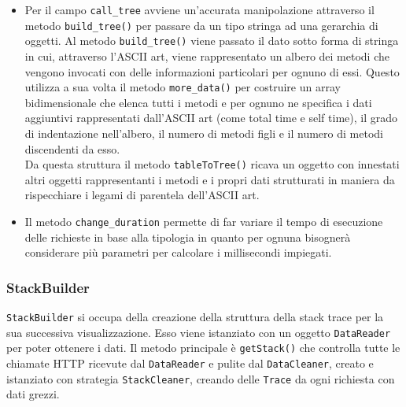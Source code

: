 \begin{itemize}
	\item Per il campo \texttt{call\_tree} avviene un'accurata manipolazione attraverso il metodo \texttt{build\_tree()} per passare da un tipo stringa ad una gerarchia di oggetti.
	Al metodo \texttt{build\_tree()} viene passato il dato sotto forma di stringa in cui, attraverso l'ASCII art, viene rappresentato un albero dei metodi che vengono invocati con delle informazioni particolari per ognuno di essi. Questo utilizza a sua volta il metodo \texttt{more\_data()} per costruire un array bidimensionale che elenca tutti i metodi e per ognuno ne specifica i dati aggiuntivi rappresentati dall'ASCII art (come total time e self time), il grado di indentazione nell'albero, il numero di metodi figli e il numero di metodi discendenti da esso. \\ Da questa struttura il metodo \texttt{tableToTree()} ricava un oggetto con innestati altri oggetti rappresentanti i metodi e i propri dati strutturati in maniera da rispecchiare i legami di parentela dell'ASCII art.
	\item 	Il metodo \texttt{change\_duration} permette di far variare il tempo di esecuzione delle richieste in base alla tipologia in quanto per ognuna bisognerà considerare più parametri per calcolare i millisecondi impiegati.
\end{itemize}

\subsubsection{StackBuilder}
\label{sec:StackBuilder}

\texttt{StackBuilder} si occupa della creazione della struttura della stack trace per la sua successiva visualizzazione.
Esso viene istanziato con un oggetto \texttt{DataReader} per poter ottenere i dati.
Il metodo principale è \texttt{getStack()} che controlla tutte le chiamate HTTP ricevute dal \texttt{DataReader} e pulite dal \texttt{DataCleaner}, creato e istanziato con strategia \texttt{StackCleaner}, creando delle \texttt{Trace} da ogni richiesta con dati grezzi.

